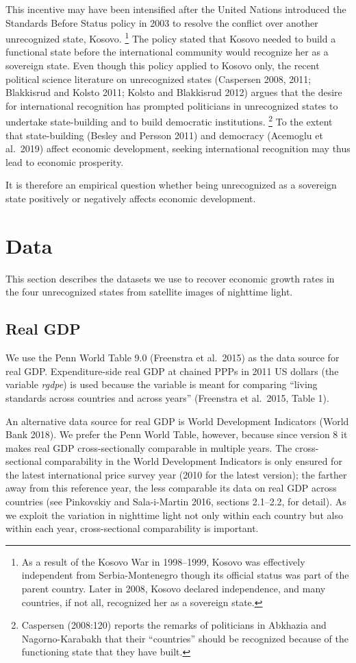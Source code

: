 \documentclass[12pt,a4paper]{article}%
\begin{document}
This incentive may have been intensified after the United Nations introduced the Standards Before Status policy in 2003 to resolve the conflict over another unrecognized state, Kosovo.%
\footnote{
	As a result of the Kosovo War in 1998--1999, Kosovo was effectively independent from Serbia-Montenegro though its official status was part of the parent country.
	Later in 2008, Kosovo declared independence, and many countries, if not all, recognized her as a sovereign state. 
} 
The policy stated that Kosovo needed to build a functional state before the international community would recognize her as a sovereign state.
Even though this policy applied to Kosovo only, the recent political science literature on unrecognized states (Caspersen 2008, 2011; Blakkisrud and Kolsto 2011; Kolsto and Blakkisrud 2012) argues that the desire for international recognition has prompted politicians in unrecognized states to undertake state-building and to build democratic institutions.%
\footnote{
	Caspersen (2008:120) reports the remarks of politicians in Abkhazia and Nagorno-Karabakh that their ``countries'' should be recognized because of the functioning state that they have built.
	}
To the extent that state-building (Besley and Persson 2011) and democracy (Acemoglu et al.\ 2019) affect economic development, seeking international recognition may thus lead to economic prosperity.

It is therefore an empirical question whether being unrecognized as a sovereign state positively or negatively affects economic development.	

\section{Data}
This section describes the datasets we use to recover economic growth rates in the four unrecognized states from satellite images of nighttime light.
\subsection{Real GDP}
We use the Penn World Table 9.0 (Freenstra et al.\ 2015) as the data source for real GDP. 
Expenditure-side real GDP at chained PPPs in 2011 US dollars (the variable \textit{rgdpe}) is used because the variable is meant for comparing ``living standards across countries and across years'' (Freenstra et al.\ 2015, Table 1).

An alternative data source for real GDP is World Development Indicators (World Bank 2018). 
We prefer the Penn World Table, however, because since version 8 it makes real GDP cross-sectionally comparable in multiple years. 
The cross-sectional comparability in the World Development Indicators is only ensured for the latest international price survey year (2010 for the latest version); the farther away from this reference year, the less comparable its data on real GDP across countries (see Pinkovskiy and Sala-i-Martin 2016, sections 2.1--2.2, for detail).
As we exploit the variation in nighttime light not only within each country but also within each year, cross-sectional comparability is important.
\end{document}
